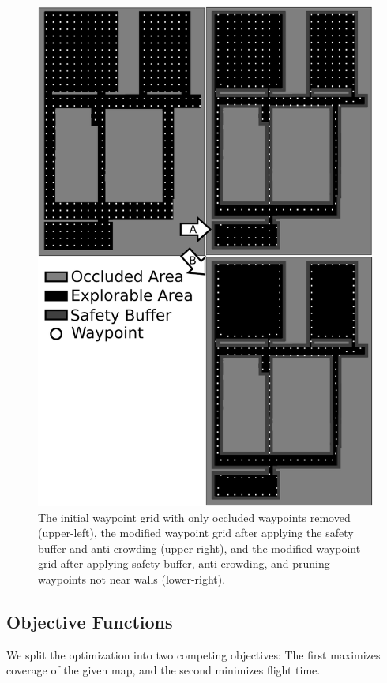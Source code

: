 \documentclass[letterpaper, 10 pt, conference]{ieeeconf}  %
\begin{document}
\begin{figure}
\centering
\includegraphics[width=1.0\linewidth]{figures/waypoint3.png}
\caption{The initial waypoint grid with only occluded waypoints removed (upper-left), the modified waypoint grid after applying the safety buffer and anti-crowding (upper-right), and the modified waypoint grid after applying safety buffer, anti-crowding, and pruning waypoints not near walls (lower-right).}
\label{fig:waypoints}
\end{figure}

\subsection{Objective Functions}

We split the optimization into two competing objectives: The first maximizes coverage of the given map, and the second minimizes flight time.
\end{document}
